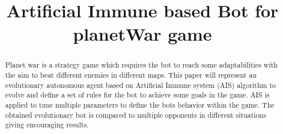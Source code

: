 \documentclass[conference]{IEEEtran}
\begin{document}
\title{\vspace{1.0cm}Artificial Immune based Bot for planetWar game}


\author{
\and
{}
\and
{}
}
\maketitle

\begin{abstract}
Planet war is a strategy game which requires the bot to reach some adaptabilities with the aim to beat different enemies in different maps. This paper will represent an evolutionary autonomous agent based on Artificial Immune system (AIS) algorithm to evolve and define a set of rules for the bot to achieve some goals in the game. AIS is applied to tune multiple parameters to define the bots behavior within the game. The obtained evolutionary bot is compared to multiple opponents in different situations giving encouraging results.
\end{abstract}
\end{document}
